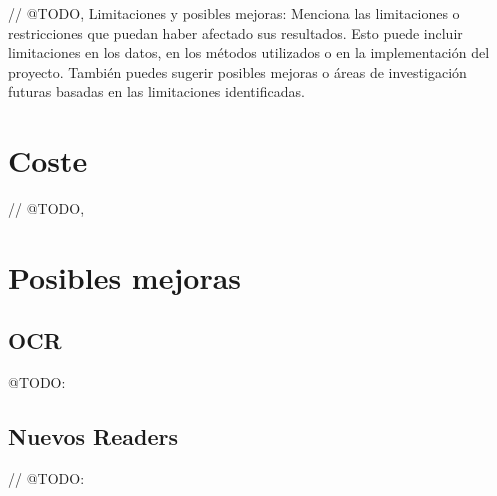 // @TODO, Limitaciones y posibles mejoras: Menciona las limitaciones o restricciones
que puedan haber afectado sus resultados.
Esto puede incluir limitaciones en los datos, en los métodos utilizados o en la implementación del proyecto.
También puedes sugerir posibles mejoras o áreas de investigación futuras basadas en las limitaciones identificadas.


\section{Coste}
// @TODO,


\section{Posibles mejoras}

\subsection*{OCR}
\colorbox{color_highlight}{@TODO:}

\subsection*{Nuevos Readers}
// @TODO:
